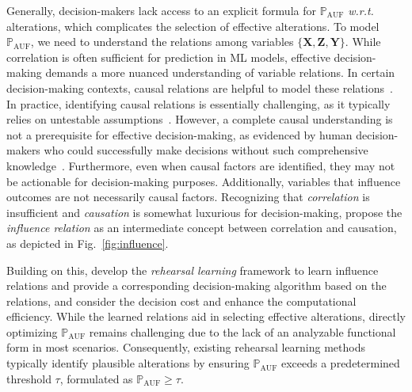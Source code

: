 \documentclass{article}
\theoremstyle{plain}
\theoremstyle{definition}
\def \X {\mathbf{X}}
\def \Y{\mathbf{Y}}
\def \wrt {\textit{w.r.t.}$\ $}
\def \Z {\mathbf{Z}}
\def \X {\mathbf{X}}
\def \Y {\mathbf{Y}}
\begin{document}
Generally, decision-makers lack access to an explicit formula for $\mathbb{P}_{\operatorname*{AUF}}$ \wrt alterations, which complicates the selection of effective alterations. To model $\mathbb{P}_{\operatorname*{AUF}}$, we need to understand the relations among variables $\{\X, \Z, \Y\}$. 
While correlation is often sufficient for prediction in ML models, effective decision-making demands a more nuanced understanding of variable relations.
In certain decision-making contexts, causal relations are helpful to model these relations~\citep{bareinboim2015bandits, latt2016causalbandit}. 
In practice, identifying causal relations is essentially challenging, as it typically relies on untestable assumptions~\citep{spirtes2000causation, scholkopf2021toward}. However, a complete causal understanding is not a prerequisite for effective decision-making, as evidenced by human decision-makers who could successfully make decisions without such comprehensive knowledge~\citep{zhouzh2022rehearsal}. Furthermore, even when causal factors are identified, they may not be actionable for decision-making purposes. Additionally, variables that influence outcomes are not necessarily causal factors.
Recognizing that \emph{correlation} is insufficient and \emph{causation} is somewhat luxurious for decision-making, \citet{zhouzh2023influence} propose the \emph{influence relation} as an intermediate concept between correlation and causation, as depicted in Fig.~\ref{fig:influence}.

Building on this, \citet{qint2023srm} develop the \emph{rehearsal learning} framework to learn influence relations and provide a corresponding decision-making algorithm based on the relations, and \citet{du2024micns} consider the decision cost and enhance the computational efficiency. 
While the learned relations aid in selecting effective alterations, directly optimizing $\mathbb{P}_{\operatorname*{AUF}}$ remains challenging due to the lack of an analyzable functional form in most scenarios. 
Consequently, existing rehearsal learning methods typically identify plausible alterations by ensuring $\mathbb{P}_{\operatorname*{AUF}}$ exceeds a predetermined threshold $\tau$, formulated as $\mathbb{P}_{\operatorname*{AUF}} \geq \tau$.
\end{document}
